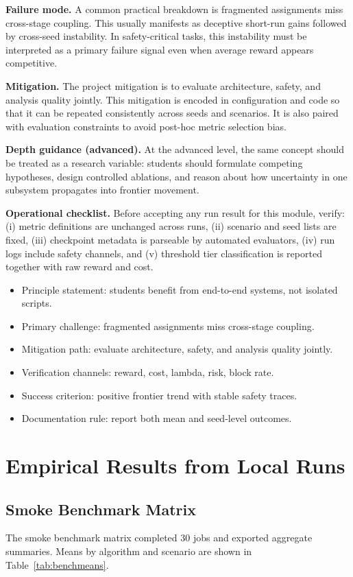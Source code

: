 \documentclass[conference]{IEEEtran}
\begin{document}
\textbf{Failure mode.} A common practical breakdown is fragmented assignments miss cross-stage coupling. This usually manifests as deceptive short-run gains followed by cross-seed instability. In safety-critical tasks, this instability must be interpreted as a primary failure signal even when average reward appears competitive.

\textbf{Mitigation.} The project mitigation is to evaluate architecture, safety, and analysis quality jointly. This mitigation is encoded in configuration and code so that it can be repeated consistently across seeds and scenarios. It is also paired with evaluation constraints to avoid post-hoc metric selection bias.

\textbf{Depth guidance (advanced).} At the advanced level, the same concept should be treated as a research variable: students should formulate competing hypotheses, design controlled ablations, and reason about how uncertainty in one subsystem propagates into frontier movement.

\textbf{Operational checklist.} Before accepting any run result for this module, verify: (i) metric definitions are unchanged across runs, (ii) scenario and seed lists are fixed, (iii) checkpoint metadata is parseable by automated evaluators, (iv) run logs include safety channels, and (v) threshold tier classification is reported together with raw reward and cost.

\begin{itemize}[leftmargin=*]
  \item Principle statement: students benefit from end-to-end systems, not isolated scripts.
  \item Primary challenge: fragmented assignments miss cross-stage coupling.
  \item Mitigation path: evaluate architecture, safety, and analysis quality jointly.
  \item Verification channels: reward, cost, lambda, risk, block rate.
  \item Success criterion: positive frontier trend with stable safety traces.
  \item Documentation rule: report both mean and seed-level outcomes.
\end{itemize}

\section{Empirical Results from Local Runs}
\subsection{Smoke Benchmark Matrix}
The smoke benchmark matrix completed 30 jobs and exported aggregate summaries. Means by algorithm and scenario are shown in Table~\ref{tab:benchmeans}.
\end{document}
